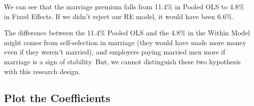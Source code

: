 \documentclass[
]{book}
\begin{document}
We can see that the marriage premium falls from 11.4\% in Pooled OLS to 4.8\% in Fixed Effects. If we didn't reject our RE model, it would have been 6.6\%.

The difference between the 11.4\% Pooled OLS and the 4.8\% in the Within Model might comes from self-selection in marriage (they would have made more money even if they weren't married), and employers paying married men more if marriage is a sign of stability. But, we cannot distinguish these two hypothesis with this research design.

\subsection*{Plot the Coefficients}\label{plot-the-coefficients}
\end{document}

